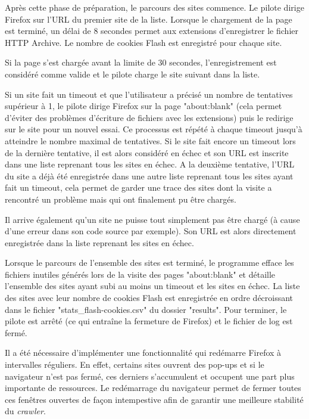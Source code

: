 Après cette phase de préparation, le parcours des sites commence. Le pilote dirige Firefox sur l'URL du premier site de la liste. Lorsque le chargement de la page est terminé, un délai de 8 secondes permet aux extensions d'enregistrer le fichier HTTP Archive. Le nombre de cookies Flash est enregistré pour chaque site.

Si la page s'est chargée avant la limite de 30 secondes, l'enregistrement est considéré comme valide et le pilote charge le site suivant dans la liste.

Si un site fait un timeout et que l'utilisateur a précisé un nombre de tentatives supérieur à 1, le pilote dirige Firefox sur la page "about:blank" (cela permet d'éviter des problèmes d'écriture de fichiers avec les extensions) puis le redirige sur le site pour un nouvel essai. Ce processus est répété à chaque timeout jusqu'à atteindre le nombre maximal de tentatives. Si le site fait encore un timeout lors de la dernière tentative, il est alors considéré en échec et son URL est inscrite dans une liste reprenant tous les sites en échec. A la deuxième tentative, l'URL du site a déjà été enregistrée dans une autre liste reprenant tous les sites ayant fait un timeout, cela permet de garder une trace des sites dont la visite a rencontré un problème mais qui ont finalement pu être chargés. 

Il arrive également qu'un site ne puisse tout simplement pas être chargé (à cause d'une erreur dans son code source par exemple). Son URL est alors directement enregistrée dans la liste reprenant les sites en échec.
\newline

Lorsque le parcours de l'ensemble des sites est terminé, le programme efface les fichiers inutiles générés lors de la visite des pages "about:blank" et détaille l'ensemble des sites ayant subi au moins un timeout et les sites en échec. La liste des sites avec leur nombre de cookies Flash est enregistrée en ordre décroissant dans le fichier "stats\_flash-cookies.csv" du dossier "results". Pour terminer, le pilote est arrêté (ce qui entraîne la fermeture de Firefox) et le fichier de log est fermé.
\newline

Il a été nécessaire d'implémenter une fonctionnalité qui redémarre Firefox à intervalles réguliers. En effet, certains sites ouvrent des pop-ups et si le navigateur n'est pas fermé, ces derniers s'accumulent et occupent une part plus importante de ressources. Le redémarrage du navigateur permet de fermer toutes ces fenêtres ouvertes de façon intempestive afin de garantir une meilleure stabilité du \textit{crawler}.

